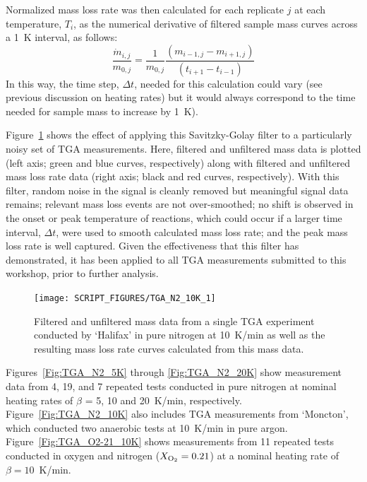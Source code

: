 \documentclass{book}
\begin{document}
Normalized mass loss rate was then calculated for each replicate $j$ at each temperature, $T_i$, as the numerical derivative of filtered sample mass curves across a 1~K interval, as follows: 
\begin{equation}
   \frac{\dot{m}_{i,j}}{m_{0,j}} = \frac{1}{m_{0,j}}\frac{\left(m_{i-1,j}-m_{i+1,j}\right)}{\left(t_{i+1}-t_{i-1}\right)}
\end{equation}
In this way, the time step, $\Delta t$, needed for this calculation could vary (see previous discussion on heating rates) but it would always correspond to the time needed for sample mass to increase by 1~K).

Figure~\ref{Fig:TGA_N2_10K_1} shows the effect of applying this Savitzky-Golay filter to a particularly noisy set of TGA measurements. Here, filtered and unfiltered mass data is plotted (left axis; green and blue curves, respectively) along with filtered and unfiltered mass loss rate data (right axis; black and red curves, respectively). With this filter, random noise in the signal is cleanly removed but meaningful signal data remains; relevant mass loss events are not over-smoothed; no shift is observed in the onset or peak temperature of reactions, which could occur if a larger time interval, $\Delta t$, were used to smooth calculated mass loss rate; and the peak mass loss rate is well captured. Given the effectiveness that this filter has demonstrated, it has been applied to all TGA measurements submitted to this workshop, prior to further analysis.

\begin{figure}[h!]
  \centering
  \texttt{[image: SCRIPT\_FIGURES/TGA\_N2\_10K\_1]}
  \caption{Filtered and unfiltered mass data from a single TGA experiment conducted by ‘Halifax’ in pure nitrogen at 10~K/min as well as the resulting mass loss rate curves calculated from this mass data.}
  \label{Fig:TGA_N2_10K_1}
\end{figure}

Figures~\ref{Fig:TGA_N2_5K} through \ref{Fig:TGA_N2_20K} show measurement data from 4, 19, and 7 repeated tests conducted in pure nitrogen at nominal heating rates of $\beta$ = 5, 10 and 20~K/min, respectively. Figure~\ref{Fig:TGA_N2_10K} also includes TGA measurements from ‘Moncton’, which conducted two anaerobic tests at 10~K/min in pure argon. Figure~\ref{Fig:TGA_O2-21_10K} shows measurements from 11 repeated tests conducted in oxygen and nitrogen ($X_{\rm O_2}=0.21$) at a nominal heating rate of $\beta=10$~K/min.
\end{document}

